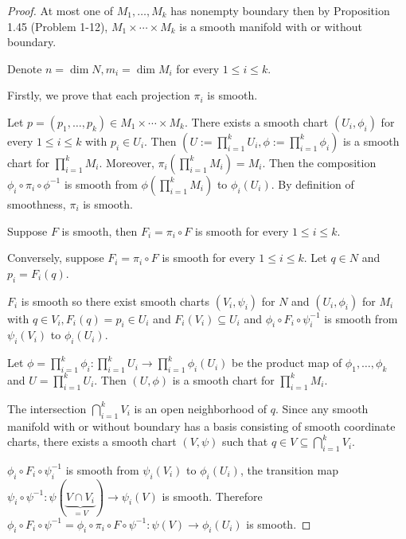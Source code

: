 \begin{proof}
    At most one of \( M_{1}, \ldots, M_{k} \) has nonempty boundary then by Proposition 1.45 (Problem 1-12), \( M_{1} \times \cdots \times M_{k} \) is a smooth manifold with or without boundary.

    Denote \( n = \dim N, m_{i} = \dim M_{i} \) for every \( 1 \le i \le k \).

    Firstly, we prove that each projection \( \pi_{i} \) is smooth.

    Let \( p = (p_{1}, \ldots, p_{k}) \in M_{1} \times \cdots \times M_{k} \). There exists a smooth chart \( (U_{i}, \phi_{i}) \) for every \( 1 \le i \le k \) with \( p_{i} \in U_{i} \). Then \( \left( U := \prod_{i=1}^{k} U_{i}, \phi := \prod_{i=1}^{k} \phi_{i} \right) \) is a smooth chart for \( \prod_{i=1}^{k} M_{i} \). Moreover, \( \pi_{i}\left( \prod_{i=1}^{k} M_{i} \right) = M_{i} \). Then the composition \( \phi_{i} \circ \pi_{i} \circ \phi^{-1} \) is smooth from \( \phi\left( \prod_{i=1}^{k} M_{i} \right) \) to \( \phi_{i}(U_{i}) \). By definition of smoothness, \( \pi_{i} \) is smooth.

    Suppose \( F \) is smooth, then \( F_{i} = \pi_{i} \circ F \) is smooth for every \( 1 \le i \le k \).

    Conversely, suppose \( F_{i} = \pi_{i} \circ F \) is smooth for every \( 1 \le i \le k \). Let \( q \in N \) and \( p_{i} = F_{i}(q) \).

    \( F_{i} \) is smooth so there exist smooth charts \( (V_{i}, \psi_{i}) \) for \( N \) and \( (U_{i}, \phi_{i}) \) for \( M_{i} \) with \( q \in V_{i}, F_{i}(q) = p_{i} \in U_{i} \) and \( F_{i}(V_{i}) \subseteq U_{i} \) and \( \phi_{i} \circ F_{i} \circ \psi_{i}^{-1} \) is smooth from \( \psi_{i}(V_{i}) \) to \( \phi_{i}(U_{i}) \).

    Let \( \phi = \prod_{i=1}^{k} \phi_{i}: \prod_{i=1}^{k} U_{i} \to \prod_{i=1}^{k} \phi_{i}(U_{i}) \) be the product map of \( \phi_{1}, \ldots, \phi_{k} \) and \( U = \prod_{i=1}^{k} U_{i} \). Then \( (U, \phi) \) is a smooth chart for \( \prod_{i=1}^{k} M_{i} \).

    The intersection \( \bigcap_{i=1}^{k} V_{i} \) is an open neighborhood of \( q \). Since any smooth manifold with or without boundary has a basis consisting of smooth coordinate charts, there exists a smooth chart \( (V, \psi) \) such that \( q \in V \subseteq \bigcap_{i=1}^{k} V_{i} \).

    \( \phi_{i} \circ F_{i} \circ \psi_{i}^{-1} \) is smooth from \( \psi_{i}(V_{i}) \) to \( \phi_{i}(U_{i}) \), the transition map \( \psi_{i} \circ \psi^{-1}: \psi(\underbrace{V \cap V_{i}}_{= V})  \to \psi_{i}(V) \) is smooth. Therefore \( \phi_{i} \circ F_{i} \circ \psi^{-1} = \phi_{i} \circ \pi_{i} \circ F \circ \psi^{-1}: \psi(V) \to \phi_{i}(U_{i}) \) is smooth.


\end{proof}
